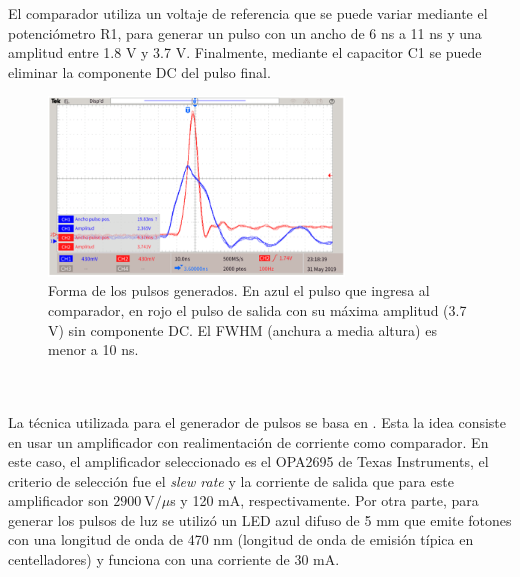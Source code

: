 El comparador utiliza un voltaje de referencia que se puede variar mediante el potenciómetro R1, para generar un pulso con un ancho de 6 ns a 11 ns y una amplitud entre 1.8 V y 3.7 V. Finalmente, mediante el capacitor C1 se puede eliminar la componente DC del pulso final.
\begin{figure}[h!]
\begin{centering}
  \includegraphics[width=0.7\textwidth]{Images/LED_Pulse_max.PNG}
    \caption{Forma de los pulsos generados. En azul el pulso que ingresa al comparador, en rojo el pulso de salida con su máxima amplitud (3.7 V) sin componente DC. El FWHM (anchura a media altura) es menor a 10 ns.} 
    \label{fig:LED_Pulse_max}
  \par\end{centering}
\end{figure}
\\ \\
La técnica utilizada para el generador de pulsos se basa en \citep{Pulses_CFA}. Esta la idea consiste en usar un amplificador con realimentación de corriente como comparador. En este caso, el amplificador seleccionado es el OPA2695 de Texas Instruments, el criterio de selección fue el \textit{slew rate} y la corriente de salida que para este amplificador son $2900~\mbox{V}/\mu$s y 120 mA, respectivamente. Por otra parte, para generar los pulsos de luz se utilizó un LED azul difuso de 5 mm que emite fotones con una longitud de onda de 470 nm (longitud de onda de emisión típica en centelladores) y funciona con una corriente  de 30 mA. \\ \\
